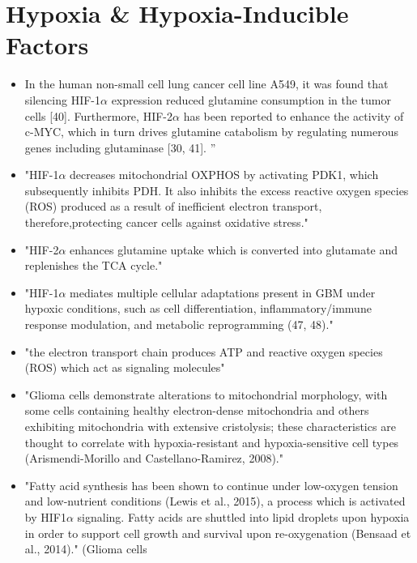 \documentclass[11pt,a4paper]{article}
\begin{document}
\section{Hypoxia \& Hypoxia-Inducible Factors}
\begin{itemize}
\item In the human non-small cell lung cancer cell line A549, it was found that silencing HIF-1$\alpha$ expression reduced glutamine consumption in the tumor cells [40]. Furthermore, HIF-2$\alpha$ has been reported to enhance the activity of c-MYC, which in turn drives glutamine catabolism by regulating numerous genes including glutaminase [30, 41]. ”\cite{Ma2022}

\item "HIF-1$\alpha$ decreases mitochondrial OXPHOS by activating PDK1, which subsequently inhibits PDH. It also inhibits the excess reactive oxygen species (ROS) produced as a result of inefficient electron transport, therefore,protecting cancer cells against oxidative stress."\cite{Mudassar2020}

\item "HIF-2$\alpha$ enhances glutamine uptake which is converted into glutamate and replenishes the TCA cycle." \cite{Mudassar2020}

\item "HIF-1$\alpha$ mediates multiple cellular adaptations present in GBM under hypoxic conditions, such as cell differentiation, inflammatory/immune response modulation, and metabolic reprogramming (47, 48)." \cite{Chen2021}

\item "the electron transport chain produces ATP and reactive oxygen species (ROS) which act as signaling molecules"\cite{Strickland2017}

\item "Glioma cells demonstrate alterations to mitochondrial morphology, with some cells containing healthy electron-dense mitochondria and others exhibiting mitochondria with extensive cristolysis; these characteristics are thought to correlate with hypoxia-resistant and hypoxia-sensitive cell types (Arismendi-Morillo and Castellano-Ramirez, 2008)."

\item "Fatty acid synthesis has been shown to continue under low-oxygen tension and low-nutrient conditions (Lewis et al., 2015), a process which is activated by HIF1$\alpha$ signaling. Fatty acids are shuttled into lipid droplets upon hypoxia in order to support cell growth and survival upon re-oxygenation (Bensaad et al., 2014)." (Glioma cells \cite{Strickland2017}


\end{itemize}
\end{document}

